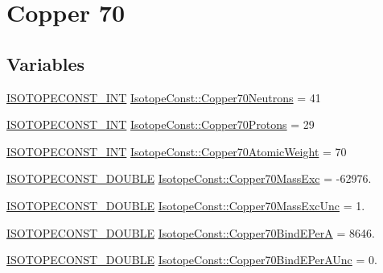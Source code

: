\hypertarget{group___isotope_const-_copper-_cu70}{}\section{Copper 70}
\label{group___isotope_const-_copper-_cu70}
\subsection*{Variables}
\begin{DoxyCompactItemize}
\item 
\mbox{\hyperlink{group___isotope_const-_macros_ga5f18360b3e99483a35c32d789e62621c}{I\+S\+O\+T\+O\+P\+E\+C\+O\+N\+S\+T\+\_\+\+I\+NT}} \mbox{\hyperlink{group___isotope_const-_copper-_cu70_gaf938c088d7ddf0458981ee493a4592f1}{Isotope\+Const\+::\+Copper70\+Neutrons}} = 41
\item 
\mbox{\hyperlink{group___isotope_const-_macros_ga5f18360b3e99483a35c32d789e62621c}{I\+S\+O\+T\+O\+P\+E\+C\+O\+N\+S\+T\+\_\+\+I\+NT}} \mbox{\hyperlink{group___isotope_const-_copper-_cu70_gad070ef5c49b04be9a11cee5a81eae635}{Isotope\+Const\+::\+Copper70\+Protons}} = 29
\item 
\mbox{\hyperlink{group___isotope_const-_macros_ga5f18360b3e99483a35c32d789e62621c}{I\+S\+O\+T\+O\+P\+E\+C\+O\+N\+S\+T\+\_\+\+I\+NT}} \mbox{\hyperlink{group___isotope_const-_copper-_cu70_gab448be06b0f3c21e5c19bd351db2edeb}{Isotope\+Const\+::\+Copper70\+Atomic\+Weight}} = 70
\item 
\mbox{\hyperlink{group___isotope_const-_macros_ga8f45a7272ce02c0b4c65c44636ed719a}{I\+S\+O\+T\+O\+P\+E\+C\+O\+N\+S\+T\+\_\+\+D\+O\+U\+B\+LE}} \mbox{\hyperlink{group___isotope_const-_copper-_cu70_ga4992183876ecaf456d590679157b816d}{Isotope\+Const\+::\+Copper70\+Mass\+Exc}} = -\/62976.
\item 
\mbox{\hyperlink{group___isotope_const-_macros_ga8f45a7272ce02c0b4c65c44636ed719a}{I\+S\+O\+T\+O\+P\+E\+C\+O\+N\+S\+T\+\_\+\+D\+O\+U\+B\+LE}} \mbox{\hyperlink{group___isotope_const-_copper-_cu70_ga82810682ad6291e148d9aa5d4a665818}{Isotope\+Const\+::\+Copper70\+Mass\+Exc\+Unc}} = 1.
\item 
\mbox{\hyperlink{group___isotope_const-_macros_ga8f45a7272ce02c0b4c65c44636ed719a}{I\+S\+O\+T\+O\+P\+E\+C\+O\+N\+S\+T\+\_\+\+D\+O\+U\+B\+LE}} \mbox{\hyperlink{group___isotope_const-_copper-_cu70_ga080ba1163df366bde6535aa3f765bdbd}{Isotope\+Const\+::\+Copper70\+Bind\+E\+PerA}} = 8646.
\item 
\mbox{\hyperlink{group___isotope_const-_macros_ga8f45a7272ce02c0b4c65c44636ed719a}{I\+S\+O\+T\+O\+P\+E\+C\+O\+N\+S\+T\+\_\+\+D\+O\+U\+B\+LE}} \mbox{\hyperlink{group___isotope_const-_copper-_cu70_gadf4afad82d61ee312e7ac13e0d7ebff5}{Isotope\+Const\+::\+Copper70\+Bind\+E\+Per\+A\+Unc}} = 0.

\end{DoxyCompactItemize}

